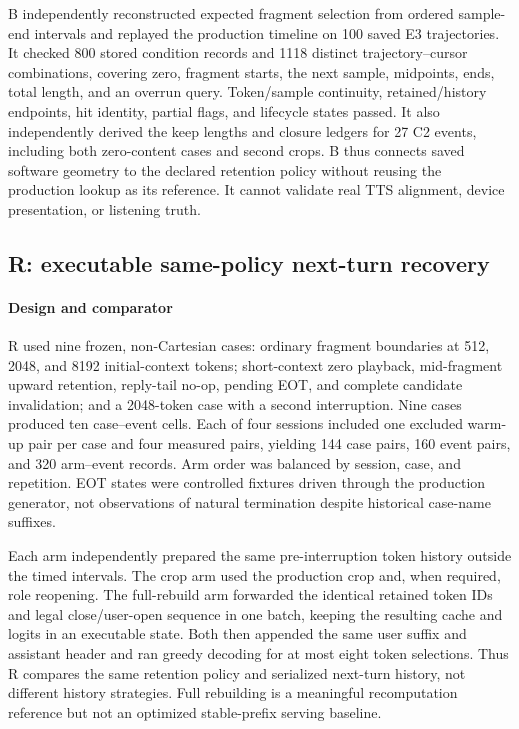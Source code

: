 B independently reconstructed expected fragment selection from ordered sample-end intervals and replayed the production timeline on 100 saved E3 trajectories. It checked 800 stored condition records and 1118 distinct trajectory--cursor combinations, covering zero, fragment starts, the next sample, midpoints, ends, total length, and an overrun query. Token/sample continuity, retained/history endpoints, hit identity, partial flags, and lifecycle states passed. It also independently derived the keep lengths and closure ledgers for 27 C2 events, including both zero-content cases and second crops. B thus connects saved software geometry to the declared retention policy without reusing the production lookup as its reference. It cannot validate real TTS alignment, device presentation, or listening truth.

\subsection{R: executable same-policy next-turn recovery}
\label{sec:recovery-cost}

\paragraph{Design and comparator}
R used nine frozen, non-Cartesian cases: ordinary fragment boundaries at 512, 2048, and 8192 initial-context tokens; short-context zero playback, mid-fragment upward retention, reply-tail no-op, pending EOT, and complete candidate invalidation; and a 2048-token case with a second interruption. Nine cases produced ten case--event cells. Each of four sessions included one excluded warm-up pair per case and four measured pairs, yielding 144 case pairs, 160 event pairs, and 320 arm--event records. Arm order was balanced by session, case, and repetition. EOT states were controlled fixtures driven through the production generator, not observations of natural termination despite historical case-name suffixes.

Each arm independently prepared the same pre-interruption token history outside the timed intervals. The crop arm used the production crop and, when required, role reopening. The full-rebuild arm forwarded the identical retained token IDs and legal close/user-open sequence in one batch, keeping the resulting cache and logits in an executable state. Both then appended the same user suffix and assistant header and ran greedy decoding for at most eight token selections. Thus R compares the same retention policy and serialized next-turn history, not different history strategies. Full rebuilding is a meaningful recomputation reference but not an optimized stable-prefix serving baseline.

